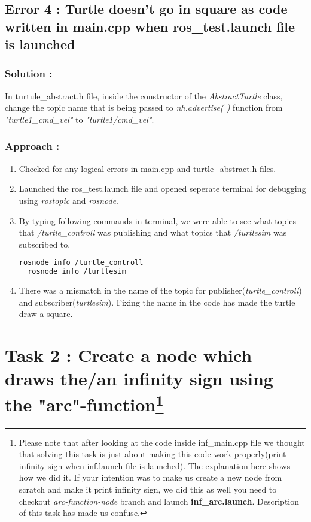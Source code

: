 \documentclass[12pt]{article}
\begin{document}

\subsection{Error 4 : Turtle doesn't go in square as code written in main.cpp when ros\_test.launch file is launched}

\subsubsection{Solution : }
In turtule\_abstract.h file, inside the constructor of the \textit{AbstractTurtle} class, change the topic name that is being passed to \textit{nh.advertise(   )} function from \textit{"turtle1\_cmd\_vel"} to \textit{"turtle1/cmd\_vel"}.

\subsubsection{Approach :}
\begin{enumerate}
\item Checked for any logical errors in main.cpp and turtle\_abstract.h files.
\item Launched the ros\_test.launch file and opened seperate terminal for debugging using \textit{rostopic} and \textit{rosnode}.
\item By typing following commands in terminal, we were able to see what topics that \textit{/turtle\_controll} was publishing and what topics that \textit{/turtlesim} was subscribed to.
\begin{lstlisting}[language=bash]
  rosnode info /turtle_controll
  rosnode info /turtlesim
\end{lstlisting}
\item There was a mismatch in the name of the topic for publisher(\textit{turtle\_controll}) and subscriber(\textit{turtlesim}). Fixing the name in the code has made the turtle draw a square.
\end{enumerate}


\section{Task 2 : Create a node which draws the/an infinity sign using the "arc"-function\footnote{Please note that after looking at the code inside inf\_main.cpp file we thought that solving this task is just about making this code work properly(print infinity sign when inf.launch file is launched). The explanation here shows how we did it. If your intention was to make us create a new node from scratch and make it print infinity sign, we did this as well you need to checkout \textit{arc-function-node} branch and launch \textbf{inf\_arc.launch}. Description of this task has made us confuse.}}
\end{document}
